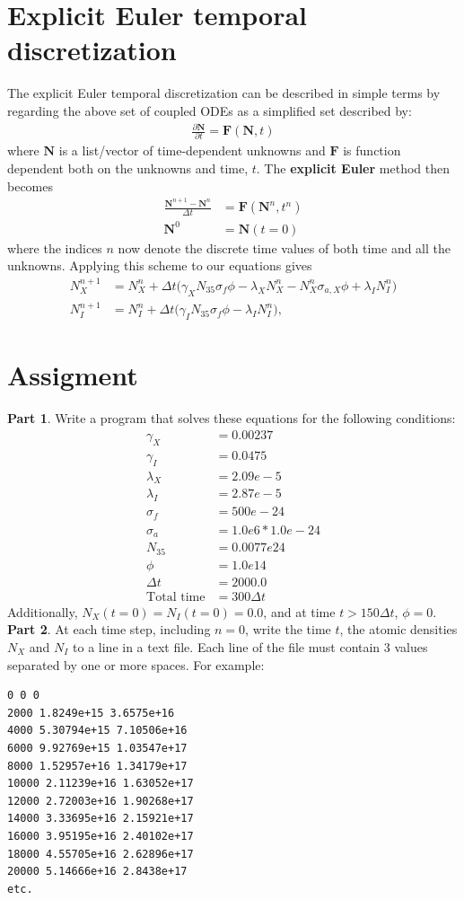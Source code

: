 \documentclass[10pt,letterpaper,notitlepage]{article}
\newcommand{\dxdy}[2]{\frac{\partial #1}{\partial #2}}
\newcommand{\beq}{\begin{equation*} \begin{aligned}}
\newcommand{\eeq}{\end{aligned}\end{equation*}}
\newcommand{\beqn}{\begin{equation}\begin{aligned}}
\newcommand{\eeqn}{\end{aligned}\end{equation}}
\begin{document}
\section{Explicit Euler temporal discretization}
The explicit Euler temporal discretization can be described in simple terms by regarding the above set of coupled ODEs as a simplified set described by:
\beqn 
\dxdy{\mathbf{N}}{t} = \mathbf{F}(\mathbf{N},t)
\eeqn 
where $\mathbf{N}$ is a list/vector of time-dependent unknowns and $\mathbf{F}$ is function dependent both on the unknowns and time, $t$. The \textbf{explicit Euler} method then becomes
\beqn 
\frac{\mathbf{N}^{n+1} - \mathbf{N}^n}{\Delta t} &= \mathbf{F}(\mathbf{N}^n,t^n) \\
\mathbf{N}^0 &= \mathbf{N}(t=0)
\eeqn 
where the indices $n$ now denote the discrete time values of both time and all the unknowns.
\newline
\newline
Applying this scheme to our equations gives
\beqn \label{eq:discretized_eqs}
N_X^{n+1} &= N_X^n + \Delta t \biggr(
\gamma_X N_{35} \sigma_f \phi  - \lambda_X N_X^n - N_X^n \sigma_{a,X} \phi + \lambda_I N_I^n
\biggr) \\
N_I^{n+1} &= N_I^n + \Delta t \biggr(
\gamma_I N_{35} \sigma_f \phi - \lambda_I N_I^n
\biggr),
\eeqn 

\section{Assigment}
\textbf{Part 1}. Write a program that solves these equations for the following conditions:
\beq
\gamma_X  &= 0.00237 \\
\gamma_I  &= 0.0475 \\
\lambda_X &= 2.09e{-}5 \\
\lambda_I &= 2.87e{-}5 \\
\sigma_f  &= 500e{-}24 \\
\sigma_a  &= 1.0e6*1.0e{-}24  \\
N_{35}     &= 0.0077e24  \\
\phi      &= 1.0e14 \\
\Delta t  &= 2000.0 \\
\text{Total time} &= 300 \Delta t
\eeq 
\newline
\newline
Additionally, $N_X(t{=}0)=N_I(t{=}0)=0.0$, and at time $t>150\Delta t$, $\phi=0$.
\newline
\newline
\textbf{Part 2}. At each time step, including $n{=}0$, write the time $t$, the atomic densities $N_X$ and $N_I$ to a line in a text file. Each line of the file must contain 3 values separated by one or more spaces. For example:
\begin{verbatim}
0 0 0
2000 1.8249e+15 3.6575e+16
4000 5.30794e+15 7.10506e+16
6000 9.92769e+15 1.03547e+17
8000 1.52957e+16 1.34179e+17
10000 2.11239e+16 1.63052e+17
12000 2.72003e+16 1.90268e+17
14000 3.33695e+16 2.15921e+17
16000 3.95195e+16 2.40102e+17
18000 4.55705e+16 2.62896e+17
20000 5.14666e+16 2.8438e+17
etc.
\end{verbatim}
\end{document}
